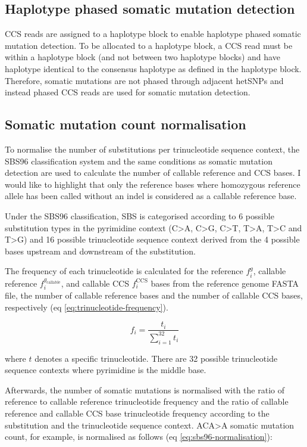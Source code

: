 \subsection{Haplotype phased somatic mutation detection}

CCS reads are assigned to a haplotype block to enable haplotype phased somatic mutation detection. To be allocated to a haplotype block, a CCS read must be within a haplotype block (and not between two haplotype blocks) and have haplotype identical to the consensus haplotype as defined in the haplotype block. Therefore, somatic mutations are not phased through adjacent hetSNPs and instead phased CCS reads are used for somatic mutation detection. 

\subsection{Somatic mutation count normalisation}
To normalise the number of substitutions per trinucleotide sequence context, the SBS96 classification system and the same conditions as somatic mutation detection are used to calculate the number of callable reference and CCS bases. I would like to highlight that only the reference bases where homozygous reference allele has been called without an indel is considered as a callable reference base. 

Under the SBS96 classification, SBS is categorised according to 6 possible substitution types in the pyrimidine context (C>A, C>G, C>T, T>A, T>C and T>G) and 16 possible trinucleotide sequence context derived from the 4 possible bases upstream and downstream of the substitution. 

The frequency of each trinucleotide is calculated for the reference $f^{g}_{i}$, callable reference $f^{g_{\text{callable}}}_{i}$, and callable CCS $f^{\text{CCS}}_{i}$ bases from the reference genome FASTA file, the number of callable reference bases and the number of callable CCS bases, respectively (eq \ref{eq:trinucleotide-frequency}). 

\begin{equation} \label{eq:trinucleotide-frequency}
f_{i} = \frac{t_{i}}{\sum^{32}_{i=1} t_{i}}
\end{equation}

where $t$ denotes a specific trinucleotide. There are 32 possible trinucleotide sequence contexts where pyrimidine is the middle base. 

Afterwards, the number of somatic mutations is normalised with the ratio of reference to callable reference trinucleotide frequency and the ratio of callable reference and callable CCS base trinucleotide frequency according to the substitution and the trinucleotide sequence context. ACA>A somatic mutation count, for example, is normalised as follows (eq \ref{eq:sbs96-normalisation}):


